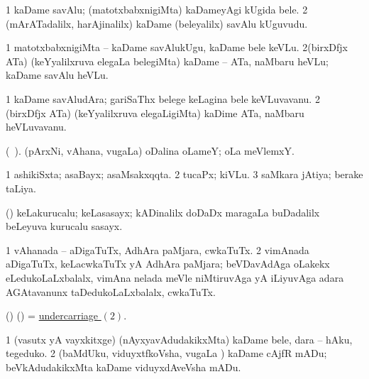 \bentry
{} 
\gl{\nA}
\expl{}
\bmng
\bnum
\num{1} kaDame savAlu; (matotxbabxnigiMta) kaDameyAgi kUgida bele. 
\num{2} (mArATadalilx, harAjinalilx) kaDame (beleyalilx) savAlu kUguvudu. 
\enum
\emng
\eentry

\bentry
{} 
\gl{\sakirx}
\bmng
\bnum
\num{1} matotxbabxnigiMta -- kaDame savAlukUgu, kaDame bele keVLu. 
\num{2}(birxDfjx ATa) (keYyalilxruva elegaLa belegiMta) kaDame -- ATa, naMbaru heVLu; kaDame savAlu heVLu. 
\enum
\emng
\eentry

\bentry
{} 
\gl{\nA}
\expl{}
\bmng
\bnum
\num{1} kaDame savAludAra; gariSaThx belege keLagina bele keVLuvavanu. 
\num{2} (birxDfjx ATa) (keYyalilxruva elegaLigiMta) kaDime ATa, naMbaru heVLuvavanu. 
\enum
\emng
\eentry

\bentry
{} 
\gl{\nA}
\expl{}
\bmng
 (\bava\ ). (pArxNi, vAhana, \mo vugaLa) oDalina oLameY; oLa meVlemxY. 
\emng
\eentry

\bentry
{} 
\gl{\gu}
\expl{}
\bmng
\bnum
\num{1} ashikiSxta; asaBayx; asaMsakxqqta. 
\num{2} tucaPx; kiVLu. 
\num{3} saMkara jAtiya; berake taLiya. 
\enum
\emng
\eentry

\bentry
{} 
\gl{\nA}
\expl{}
\bmng
 (\ame) keLakurucalu; keLasasayx; kADinalilx doDaDx maragaLa buDadalilx beLeyuva kurucalu sasayx. 
\emng
\eentry

\bentry
{} 
\gl{\nA}
\expl{}
\bmng
\bnum
\num{1} vAhanada -- aDigaTuTx, AdhAra paMjara, cwkaTuTx. 
\hypertarget{undercarriage(2)}{} 
\num{2} vimAnada aDigaTuTx, keLacwkaTuTx yA AdhAra paMjara; beVDavAdAga oLakekx eLedukoLaLxbalalx, vimAna nelada meVle niMtiruvAga yA iLiyuvAga adara AGAtavanunx taDedukoLaLxbalalx, cwkaTuTx. 
\enum
\emng
\eentry

\bentry
{} 
\gl{\nA}
\expl{}
\bmng
 (\birx) (\AmA) = \hyperlink{undercarriage(2)}{undercarriage \((2)\)}. 
\emng
\eentry

\bentry
{} 
\gl{\sakirx}
\expl{}
\bmng
\bnum
\num{1} (vasutx yA vayxkitxge) (nAyxyavAdudakikxMta) kaDame bele, dara -- hAku, tegeduko. 
\num{2} (baMdUku, viduyxtfkoVsha, \mo vugaLa \vi) kaDame cAjfR mADu; beVkAdudakikxMta kaDame viduyxdAveVsha mADu. 
\enum
\emng
\eentry

